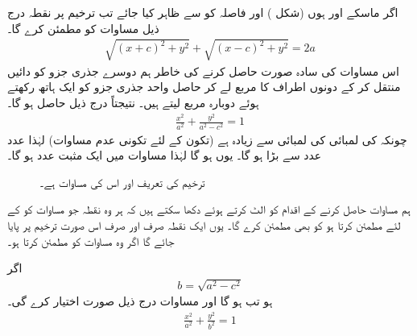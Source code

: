 اگر ماسکے  اور  ہوں (شکل ) اور فاصلہ  کو  سے ظاہر کیا جائے تب ترخیم پر نقطہ  درج ذیل مساوات کو مطمئن کرے گا۔
\begin{align*}
\sqrt{(x+c)^2+y^2}+\sqrt{(x-c)^2+y^2}=2a
\end{align*}
اس مساوات کی سادہ صورت حاصل کرنے کی خاطر ہم دوسرے جذری جزو کو دائیں منتقل کر کے دونوں اطراف کا مربع لے کر حاصل واحد جذری جزو کو ایک ہاتھ رکھتے ہوئے دوبارہ مربع لیتے ہیں۔ نتیجتاً درج ذیل حاصل ہو گا۔ 
\begin{align}\label{مساوات_مخروط_ترخیم_الف}
\frac{x^2}{a^2}+\frac{y^2}{a^2-c^2}=1
\end{align} 
چونکہ  کی لمبائی  کی لمبائی سے زیادہ ہے (تکون  کے لئے تکونی عدم مساوات) لہٰذا عدد   عدد  سے بڑا ہو گا۔ یوں  ہو گا لہٰذا  مساوات  میں  ایک مثبت عدد ہو گا۔

\begin{figure}
\centering
{}
\caption{ترخیم کی تعریف اور اس کی مساوات   ہے۔}
\label{شکل_مخروط_مساوات_ترخیم}
\end{figure}

ہم مساوات  حاصل کرنے کے اقدام کو الٹ کرتے ہوئے دکھا سکتے ہیں کہ ہر وہ نقطہ جو مساوات   کو  کے لئے مطمئن کرتا ہو  کو بھی مطمئن کرے گا۔ یوں ایک نقطہ صرف اور صرف اس صورت ترخیم پر پایا جائے گا اگر وہ مساوات  کو مطمئن کرتا ہو۔

اگر
\begin{align}\label{مساوات_مخروط_ترخیم_ب}
b=\sqrt{a^2-c^2}
\end{align}
ہو تب  ہو گا اور مساوات  درج ذیل صورت اختیار کرے گی۔
\begin{align}\label{مساوات_مخروط_ترخیم_پ}
\frac{x^2}{a^2}+\frac{y^2}{b^2}=1
\end{align}

